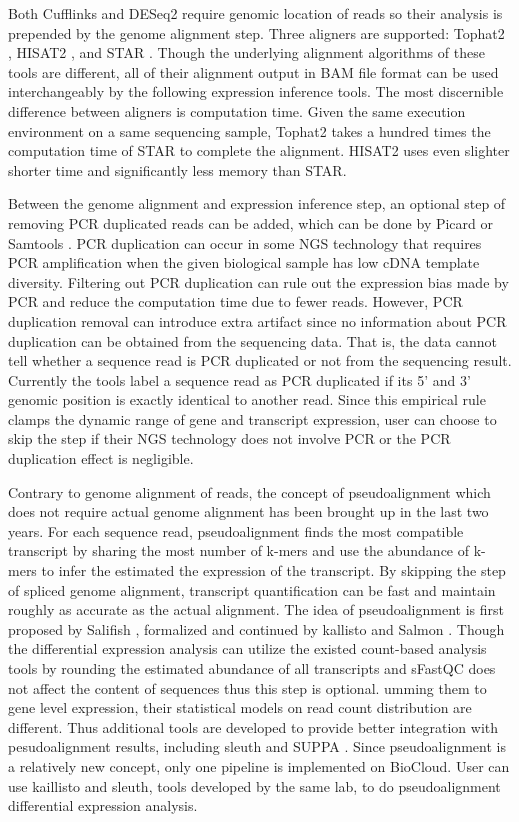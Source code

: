 Both Cufflinks and DESeq2 require genomic location of reads so their analysis
is prepended by the genome alignment step. Three aligners are supported:
Tophat2 \cite{kim2013:tophat2}, HISAT2 \cite{kim2015:hisat}, and STAR
\cite{dobin2013:star}. Though the underlying alignment algorithms of these
tools are different, all of their alignment output in BAM file format can be
used interchangeably by the following expression inference tools. The most
discernible difference between aligners is computation time. Given the same
execution environment on a same sequencing sample, Tophat2 takes a hundred
times the computation time of STAR to complete the alignment. HISAT2 uses even
slighter shorter time and significantly less memory than STAR.

Between the genome alignment and expression inference step, an optional step of
removing PCR duplicated reads can be added, which can be done by Picard
\cite{:picard} or Samtools \cite{li2009:sequence}. PCR duplication can occur in
some NGS technology that requires PCR amplification when the given biological
sample has low cDNA template diversity. Filtering out PCR duplication can rule
out the expression bias made by PCR and reduce the computation time due to
fewer reads. However, PCR duplication removal can introduce extra artifact
since no information about PCR duplication can be obtained from the sequencing
data.  That is, the data cannot tell whether a sequence read is PCR duplicated
or not from the sequencing result. Currently the tools label a sequence read as
PCR duplicated if its 5' and 3' genomic position is exactly identical to
another read. Since this empirical rule clamps the dynamic range of gene and
transcript expression, user can choose to skip the step if their NGS technology
does not involve PCR or the PCR duplication effect is negligible.

Contrary to genome alignment of reads, the concept of pseudoalignment which
does not require actual genome alignment has been brought up in the last two
years. For each sequence read, pseudoalignment finds the most compatible
transcript by sharing the most number of k-mers and use the abundance of k-mers
to infer the estimated the expression of the transcript. By skipping the step
of spliced genome alignment, transcript quantification can be fast and maintain
roughly as accurate as the actual alignment. The idea of pseudoalignment is
first proposed by Salifish \cite{patro2014:sailfish}, formalized and continued
by kallisto \cite{bray2016:nearoptimal} and Salmon \cite{patro2015:accurate}.
Though the differential expression analysis can utilize the existed count-based
analysis tools by rounding the estimated abundance of all transcripts and
sFastQC does not affect the content of sequences
thus this step is optional.
umming them to gene level expression, their statistical models on read count
distribution are different. Thus additional tools are developed to provide
better integration with pesudoalignment results, including sleuth
\cite{pimentel2016:differential} and SUPPA \cite{alamancos2015:leveraging}.
Since pseudoalignment is a relatively new concept, only one pipeline is
implemented on BioCloud. User can use kaillisto and sleuth, tools developed by
the same lab, to do pseudoalignment differential expression analysis.

